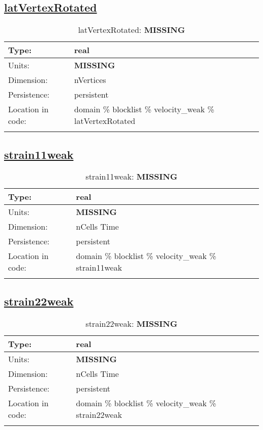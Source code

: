 \subsection[latVertexRotated]{\hyperref[sec:var_tab_velocity_weak]{latVertexRotated}}
\label{subsec:var_sec_velocity_weak_latVertexRotated}
\begin{center}
\begin{longtable}{| p{2.0in} | p{4.0in} |}
        \hline 
        Type: & real \\
        \hline 
        Units: & {\bf \color{red} MISSING} \\
        \hline 
        Dimension: & nVertices \\
        \hline 
        Persistence: & persistent \\
        \hline 
         Location in code: & domain \% blocklist \% velocity\_weak \% latVertexRotated \\
         \hline 
    \caption{latVertexRotated: {\bf \color{red} MISSING}}
\end{longtable}
\end{center}
\subsection[strain11weak]{\hyperref[sec:var_tab_velocity_weak]{strain11weak}}
\label{subsec:var_sec_velocity_weak_strain11weak}
\begin{center}
\begin{longtable}{| p{2.0in} | p{4.0in} |}
        \hline 
        Type: & real \\
        \hline 
        Units: & {\bf \color{red} MISSING} \\
        \hline 
        Dimension: & nCells Time \\
        \hline 
        Persistence: & persistent \\
        \hline 
         Location in code: & domain \% blocklist \% velocity\_weak \% strain11weak \\
         \hline 
    \caption{strain11weak: {\bf \color{red} MISSING}}
\end{longtable}
\end{center}
\subsection[strain22weak]{\hyperref[sec:var_tab_velocity_weak]{strain22weak}}
\label{subsec:var_sec_velocity_weak_strain22weak}
\begin{center}
\begin{longtable}{| p{2.0in} | p{4.0in} |}
        \hline 
        Type: & real \\
        \hline 
        Units: & {\bf \color{red} MISSING} \\
        \hline 
        Dimension: & nCells Time \\
        \hline 
        Persistence: & persistent \\
        \hline 
         Location in code: & domain \% blocklist \% velocity\_weak \% strain22weak \\
         \hline 
    \caption{strain22weak: {\bf \color{red} MISSING}}
\end{longtable}
\end{center}

